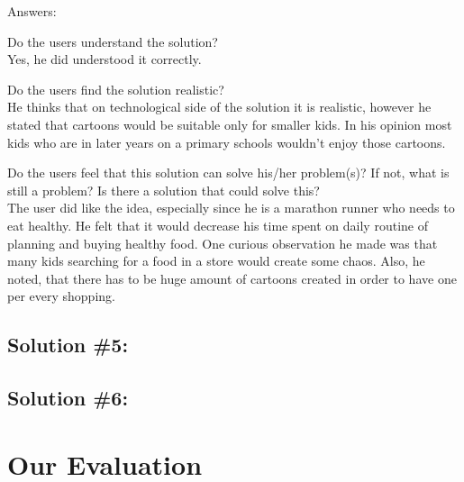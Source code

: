\documentclass[a4paper,10pt,oneside]{scrreprt}
\begin{document}
Answers:
\begin{compactitem}
	\item Do the users understand the solution?\\
		Yes, he did understood it correctly.\\
	
	\item Do the users find the solution realistic?\\
		He thinks that on technological side of the solution it is realistic, however he stated that cartoons would be suitable only for smaller kids. In his opinion 
most kids who are in later years on a primary schools wouldn't enjoy those cartoons.
\\
		
	\item Do the users feel that this solution can solve his/her problem(s)? If not, what is still
	a problem? Is there a solution that could solve this?\\
		The user did like the idea, especially since he is a marathon runner who needs to eat healthy. He felt that
it would decrease his time spent on daily routine of planning and buying healthy food. One curious observation he made was that many kids searching for a food 
in a store would create some chaos. Also, he noted, that there has to be huge amount of cartoons created in order to have one per every shopping.

\end{compactitem}

\clearpage
\section{Solution \#5:}

\clearpage
\section{Solution \#6:}

\chapter{Our Evaluation}
\end{document}
